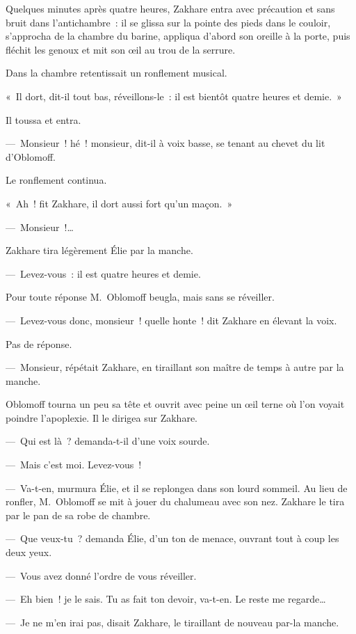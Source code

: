 \documentclass[french,twoside]{book} %
\begin{document}
\noindent Quelques minutes après quatre heures, Zakhare entra avec précaution et sans bruit dans l’antichambre : il se glissa sur la pointe des pieds dans le couloir, s’approcha de la chambre du barine, appliqua d’abord son oreille à la porte, puis fléchit les genoux et mit son œil au trou de la serrure.\par
Dans la chambre retentissait un ronflement musical.\par
« Il dort, dit-il tout bas, réveillons-le : il est bientôt quatre heures et demie. »\par
Il toussa et entra.\par
— Monsieur ! hé ! monsieur, dit-il à voix basse, se tenant au chevet du lit d’Oblomoff.\par
Le ronflement continua.\par
« Ah ! fit Zakhare, il dort aussi fort qu’un maçon. »\par
— Monsieur !…\par
Zakhare tira légèrement Élie par la manche.\par
— Levez-vous : il est quatre heures et demie.\par
Pour toute réponse M. Oblomoff beugla, mais sans se réveiller.\par
— Levez-vous donc, monsieur ! quelle honte ! dit Zakhare en élevant la voix.\par
Pas de réponse.\par
— Monsieur, répétait Zakhare, en tiraillant son maître de temps à autre par la manche.\par
Oblomoff tourna un peu sa tête et ouvrit avec peine un œil terne où l’on voyait poindre l’apoplexie. Il le dirigea sur Zakhare.\par
— Qui est là ? demanda-t-il d’une voix sourde.\par
— Mais c’est moi. Levez-vous !\par
— Va-t-en, murmura Élie, et il se replongea dans son lourd sommeil. Au lieu de ronfler, M. Oblomoff se mit à jouer du chalumeau avec son nez. Zakhare le tira par le pan de sa robe de chambre.\par
— Que veux-tu ? demanda Élie, d’un ton de menace, ouvrant tout à coup les deux yeux.\par
— Vous avez donné l’ordre de vous réveiller.\par
— Eh bien ! je le sais. Tu as fait ton devoir, va-t-en. Le reste me regarde…\par
— Je ne m’en irai pas, disait Zakhare, le tiraillant de nouveau par-la manche.\par
\end{document}
